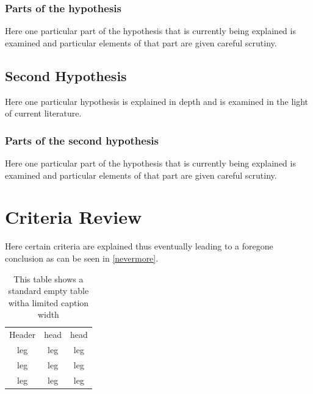 \subsubsection{Parts of the hypothesis}

Here one particular part of the hypothesis that is 
currently being explained is examined and particular
elements of that part are given careful scrutiny.


\subsection{Second Hypothesis}

Here one particular hypothesis is explained in depth
and is examined in the light of current literature.

\subsubsection{Parts of the second hypothesis}

Here one particular part of the hypothesis that is 
currently being explained is examined and particular
elements of that part are given careful scrutiny.

\section{Criteria Review}

Here certain criteria are explained thus eventually
leading to a foregone conclusion as can be seen in
\autoref{nevermore}.
\begin{table}[h!tb] \centering
    \begin{tabular}{c|c|c}
        Header & head  & head\\ 
        leg & leg & leg \\
        leg & leg & leg \\
        leg & leg & leg \\
    \end{tabular}
    \captionsetup{width=2in}
    \caption{This table shows a standard empty table witha limited caption width}
\label{nevermore}

\vspace{ 2 in}
\end{table}

